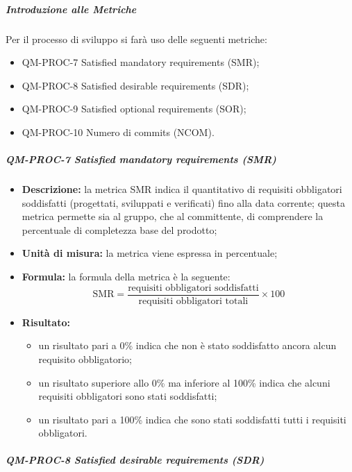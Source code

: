 			\subparagraph{Introduzione alle Metriche}
			Per il processo di sviluppo si farà uso delle seguenti metriche:

			\begin{itemize}
				\item QM-PROC-7 Satisfied mandatory requirements (SMR);
				\item QM-PROC-8 Satisfied desirable requirements (SDR);
				\item QM-PROC-9 Satisfied optional requirements (SOR);
				\item QM-PROC-10 Numero di commits (NCOM).
			\end{itemize}

			\subparagraph{QM-PROC-7 Satisfied mandatory requirements (SMR)}

			\begin{itemize}

				\item \textbf{Descrizione: }
				la metrica SMR indica il quantitativo di requisiti obbligatori soddisfatti (progettati, sviluppati e verificati) fino alla data corrente; questa metrica permette sia al gruppo, che al committente, di comprendere la percentuale di completezza base del prodotto;

				\item \textbf{Unità di misura: }
				la metrica viene espressa in percentuale;

				\item \textbf{Formula: }
				la formula della metrica è la seguente:
				\[
					\text{SMR} = \frac{\text{requisiti obbligatori soddisfatti}}{\text{requisiti obbligatori totali}} \times 100
				\]

				\item \textbf{Risultato: }
				\begin{itemize}
					\item un risultato pari a 0\% indica che non è stato soddisfatto ancora alcun requisito obbligatorio;
					\item un risultato superiore allo 0\% ma inferiore al 100\% indica che alcuni requisiti obbligatori sono stati soddisfatti;
					\item un risultato pari a 100\% indica che sono stati soddisfatti tutti i requisiti obbligatori.
				\end{itemize}

			\end{itemize}

			\subparagraph{QM-PROC-8 Satisfied desirable requirements (SDR)}


